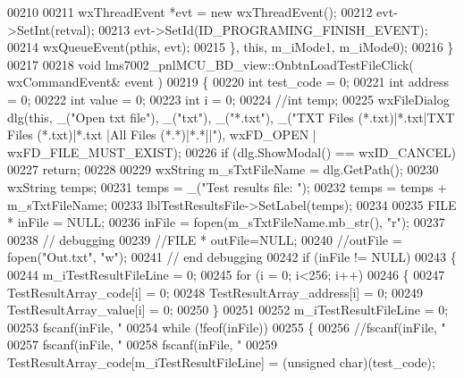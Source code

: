 \begin{DoxyCode}
{00210 
00211         wxThreadEvent *evt = \textcolor{keyword}{new} wxThreadEvent();
00212         evt->SetInt(retval);
00213         evt->SetId(ID_PROGRAMING_FINISH_EVENT);
00214         wxQueueEvent(pthis, evt);
00215     \}, \textcolor{keyword}{this}, m_iMode1, m_iMode0);
00216 \}
00217 
00218 \textcolor{keywordtype}{void} lms7002_pnlMCU_BD_view::OnbtnLoadTestFileClick( wxCommandEvent& event )
00219 \{
00220     \textcolor{keywordtype}{int}  test\_code = 0;
00221     \textcolor{keywordtype}{int}  address = 0;
00222     \textcolor{keywordtype}{int}  value = 0;
00223     \textcolor{keywordtype}{int} i = 0;
00224     \textcolor{comment}{//int temp;}
00225     wxFileDialog dlg(\textcolor{keyword}{this}, \_(\textcolor{stringliteral}{"Open txt file"}), \_(\textcolor{stringliteral}{"txt"}), \_(\textcolor{stringliteral}{"*.txt"}), \_(\textcolor{stringliteral}{"TXT Files (*.txt)|*.txt|TXT Files
       (*.txt)|*.txt |All Files (*.*)|*.*||"}), wxFD\_OPEN | wxFD\_FILE\_MUST\_EXIST);
00226     \textcolor{keywordflow}{if} (dlg.ShowModal() == wxID\_CANCEL)
00227         \textcolor{keywordflow}{return};
00228 
00229     wxString m\_sTxtFileName = dlg.GetPath();
00230     wxString temps;
00231     temps = \_(\textcolor{stringliteral}{"Test results file: "});
00232     temps = temps + m\_sTxtFileName;
00233     lblTestResultsFile->SetLabel(temps);
00234 
00235     FILE * inFile = NULL;
00236     inFile = fopen(m\_sTxtFileName.mb\_str(), \textcolor{stringliteral}{"r"});
00237 
00238     \textcolor{comment}{// debugging}
00239     \textcolor{comment}{//FILE * outFile=NULL;}
00240     \textcolor{comment}{//outFile = fopen("Out.txt", "w");}
00241     \textcolor{comment}{// end debugging}
00242     \textcolor{keywordflow}{if} (inFile != NULL)
00243     \{
00244         m_iTestResultFileLine = 0;
00245         \textcolor{keywordflow}{for} (i = 0; i<256; i++)
00246         \{
00247             TestResultArray_code[i] = 0;
00248             TestResultArray_address[i] = 0;
00249             TestResultArray_value[i] = 0;
00250         \}
00251 
00252         m_iTestResultFileLine = 0;
00253         fscanf(inFile, \textcolor{stringliteral}{"%
00254         \textcolor{keywordflow}{while} (!feof(inFile))
00255         \{
00256             \textcolor{comment}{//fscanf(inFile, "%
00257             fscanf(inFile, \textcolor{stringliteral}{"%
00258             fscanf(inFile, \textcolor{stringliteral}{"%
00259             TestResultArray_code[m_iTestResultFileLine] = (\textcolor{keywordtype}{unsigned} char)(test\_code);
}}}}}
\end{DoxyCode}
